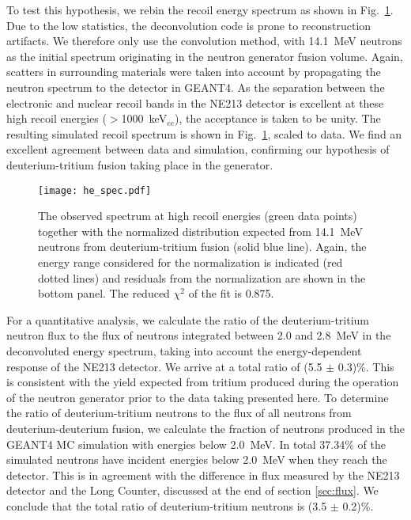 To test this hypothesis, we rebin the recoil energy spectrum as shown in Fig.~\ref{he_spec}. Due to the low statistics, the deconvolution code is prone to reconstruction artifacts. We therefore only use the convolution method, with \SI{14.1}{MeV} neutrons as the initial spectrum originating in the neutron generator fusion volume. Again, scatters in surrounding materials were taken into account by propagating the neutron spectrum to the detector in GEANT4. As the separation between the electronic and nuclear recoil bands in the NE213 detector is excellent at these high recoil energies ($>$\SI{1000}{keV}$_{ee}$), the acceptance is taken to be unity. The resulting simulated recoil spectrum is shown in Fig.~\ref{he_spec}, scaled to data. We find an excellent agreement between data and simulation, confirming our hypothesis of deuterium-tritium fusion taking place in the generator.

\begin{figure}[!htbp]
\begin{center}
\texttt{[image: he\_spec.pdf]}
\caption{The observed spectrum at high recoil energies (green data points) together with the normalized distribution expected from \SI{14.1}{MeV} neutrons from deuterium-tritium fusion (solid blue line). Again, the energy range considered for the normalization is indicated (red dotted lines) and residuals from the normalization are shown in the bottom panel. The reduced $\chi^2$ of the fit is 0.875.}
\label{he_spec}
\end{center}
\end{figure}

For a quantitative analysis, we calculate the ratio of the deuterium-tritium neutron flux to the flux of neutrons integrated between \num{2.0} and \SI{2.8}{MeV} in the deconvoluted energy spectrum, taking into account the energy-dependent response of the NE213 detector. We arrive at a total ratio of (\num{5.5} $\pm$ 0.3)\%. This is consistent with the yield expected from tritium produced during the operation of the neutron generator prior to the data taking presented here. To determine the ratio of deuterium-tritium neutrons to the flux of all neutrons from deuterium-deuterium fusion, we calculate the fraction of neutrons produced in the GEANT4 MC simulation with energies below \SI{2.0}{MeV}. In total 37.34\% of the simulated neutrons have incident energies below \SI{2.0}{MeV} when they reach the detector. This is in agreement with the difference in flux measured by the NE213 detector and the Long Counter, discussed at the end of section \ref{sec:flux}. We conclude that the total ratio of deuterium-tritium neutrons is (\num{3.5} $\pm$ 0.2)\%.

